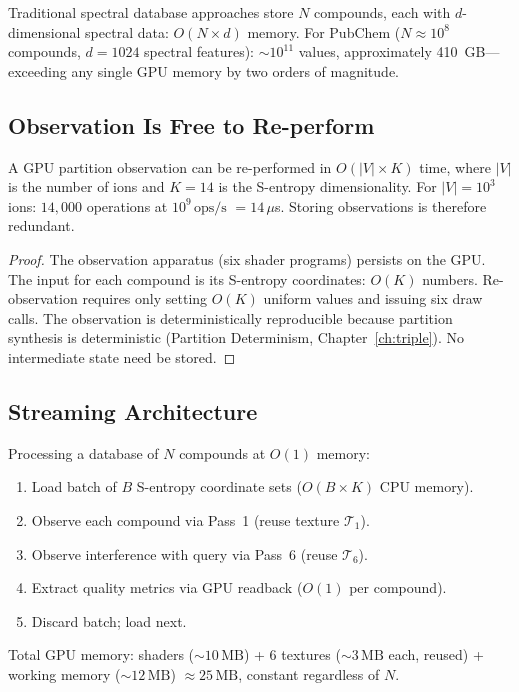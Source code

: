 Traditional spectral database approaches store $N$ compounds, each with
$d$-dimensional spectral data: $O(N\times d)$ memory.  For PubChem
($N \approx 10^8$ compounds, $d = 1024$ spectral features): $\sim 10^{11}$
values, approximately 410~GB---exceeding any single GPU memory by two orders
of magnitude.

\subsection{Observation Is Free to Re-perform}

\begin{theorem}
\label{thm:ch22-reperform}
  A GPU partition observation can be re-performed in $O(|V|\times K)$ time,
  where $|V|$ is the number of ions and $K = 14$ is the S-entropy
  dimensionality.  For $|V| = 10^3$ ions: $14{,}000$ operations at
  $10^9\,\mathrm{ops/s}$ $= 14\,\mu$s.  Storing observations is therefore
  redundant.
\end{theorem}

\begin{proof}
  The observation apparatus (six shader programs) persists on the GPU.
  The input for each compound is its S-entropy coordinates: $O(K)$ numbers.
  Re-observation requires only setting $O(K)$ uniform values and issuing
  six draw calls.  The observation is deterministically reproducible because
  partition synthesis is deterministic (Partition Determinism,
  Chapter~\ref{ch:triple}).  No intermediate state need be stored.
\end{proof}

\subsection{Streaming Architecture}

\begin{protocol}
\label{prot:ch22-streaming}
  Processing a database of $N$ compounds at $O(1)$ memory:
  \begin{enumerate}
    \item Load batch of $B$ S-entropy coordinate sets
      ($O(B\times K)$ CPU memory).
    \item Observe each compound via Pass~1 (reuse texture $\mathcal{T}_1$).
    \item Observe interference with query via Pass~6 (reuse $\mathcal{T}_6$).
    \item Extract quality metrics via GPU readback ($O(1)$ per compound).
    \item Discard batch; load next.
  \end{enumerate}
  Total GPU memory: shaders (${\sim}10\,\mathrm{MB}$) + 6 textures
  (${\sim}3\,\mathrm{MB}$ each, reused) + working memory (${\sim}12\,\mathrm{MB}$)
  $\approx 25\,\mathrm{MB}$, constant regardless of $N$.
\end{protocol}

